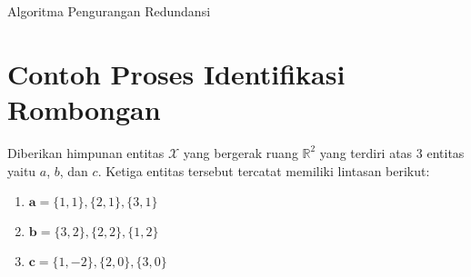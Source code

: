 \begin{algorithm}[h]
    \caption{Algoritma Pengurangan Redundansi}
    \DontPrintSemicolon
    
    \label{bab3:redundansi}
    
 
  
    
\end{algorithm}

\section{Contoh Proses Identifikasi Rombongan}
\label{sec:algorithm-example}

Diberikan himpunan entitas $\mathcal{X}$ yang bergerak ruang $\mathbb{R}^2$ yang terdiri atas 3 entitas yaitu $a$, $b$, dan $c$. Ketiga entitas tersebut tercatat memiliki lintasan berikut:

\begin{enumerate}
    \item $\textbf{a} = \{ 1, 1 \}, \{ 2, 1 \}, \{ 3, 1 \}$
    \item $\textbf{b} = \{ 3, 2 \}, \{ 2, 2 \}, \{ 1, 2 \}$
    \item $\textbf{c} = \{ 1, -2 \}, \{ 2, 0 \}, \{ 3, 0 \}$
\end{enumerate}

